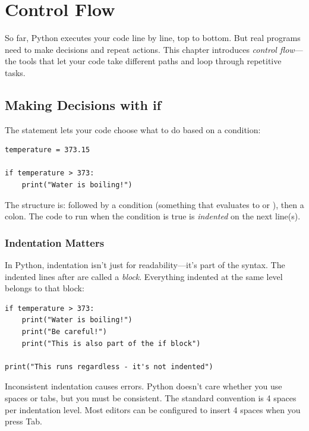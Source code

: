
\chapter{Control Flow}
\label{chap:control-flow}

So far, Python executes your code line by line, top to bottom. But real programs need to make decisions and repeat actions. This chapter introduces \emph{control flow}---the tools that let your code take different paths and loop through repetitive tasks.

\section{Making Decisions with if}
\label{sec:if}

The  statement lets your code choose what to do based on a condition:

\begin{lstlisting}
temperature = 373.15

if temperature > 373:
    print("Water is boiling!")
\end{lstlisting}

The structure is:  followed by a condition (something that evaluates to  or ), then a colon. The code to run when the condition is true is \emph{indented} on the next line(s).

\subsection{Indentation Matters}

In Python, indentation isn't just for readability---it's part of the syntax. The indented lines after  are called a \emph{block}. Everything indented at the same level belongs to that block:

\begin{lstlisting}
if temperature > 373:
    print("Water is boiling!")
    print("Be careful!")
    print("This is also part of the if block")

print("This runs regardless - it's not indented")
\end{lstlisting}

\begin{warning}
Inconsistent indentation causes errors. Python doesn't care whether you use spaces or tabs, but you must be consistent. The standard convention is 4 spaces per indentation level. Most editors can be configured to insert 4 spaces when you press Tab.
\end{warning}

